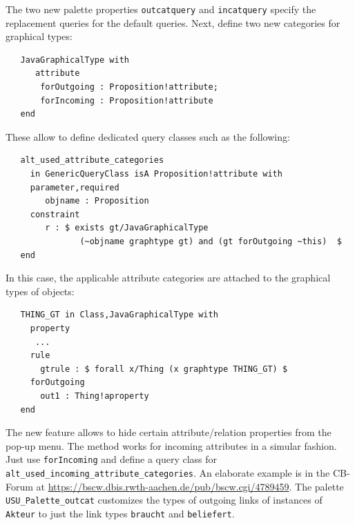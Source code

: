 The two new palette properties {\tt outcatquery} and {\tt incatquery} specify the
replacement queries for the default queries. Next, define two new categories for graphical types:

{\small
\begin{verbatim}
   JavaGraphicalType with 
      attribute
       forOutgoing : Proposition!attribute;
       forIncoming : Proposition!attribute
   end
\end{verbatim}
}


These allow to define dedicated query classes such as the following:

{\small
\begin{verbatim}
   alt_used_attribute_categories
     in GenericQueryClass isA Proposition!attribute with 
     parameter,required
        objname : Proposition
     constraint
        r : $ exists gt/JavaGraphicalType 
               (~objname graphtype gt) and (gt forOutgoing ~this)  $
   end 
\end{verbatim}
}

In this case, the applicable attribute categories are attached to the graphical types of objects:



{\small
\begin{verbatim}
   THING_GT in Class,JavaGraphicalType with 
     property
      ...
     rule
       gtrule : $ forall x/Thing (x graphtype THING_GT) $
     forOutgoing
       out1 : Thing!aproperty
   end 
\end{verbatim}
}


The new feature allows to hide certain attribute/relation properties from the pop-up menu. 
The method works for incoming attributes in a simular fashion. Just use {\tt forIncoming} and define a query class for
{\tt alt\_used\_incoming\_attribute\_categories}.
An elaborate example is in the CB-Forum at \url{https://bscw.dbis.rwth-aachen.de/pub/bscw.cgi/4789459}. The palette {\tt USU\_Palette\_outcat} customizes the types of outgoing links of instances of {\tt Akteur} to
just the link types {\tt braucht} and {\tt beliefert}.





